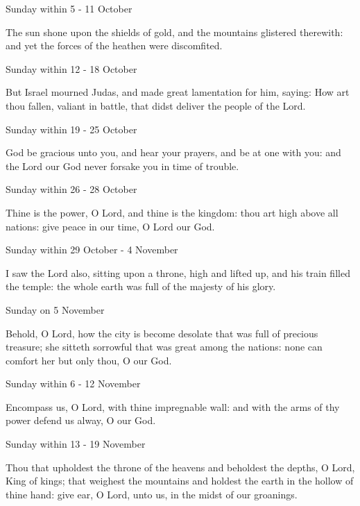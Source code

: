 \begin{multicols}{2}
\begin{inhead}
Sunday within 5 - 11 October
\end{inhead}\par\noindent
The sun shone {\dag} upon the shields of gold, and the mountains glistered therewith: and yet the forces of the heathen were discomfited.
\begin{inhead}
Sunday within 12 - 18 October
\end{inhead}\par\noindent
But Israel mourned Judas, {\dag} and made great lamentation for him, saying: How art thou fallen, valiant in battle, that didst deliver the people of the Lord.
\begin{inhead}
Sunday within 19 - 25 October
\end{inhead}\par\noindent
God be gracious unto you, {\dag} and hear your prayers, and be at one with you: and the Lord our God never forsake you in time of trouble.
\begin{inhead}
Sunday within 26 - 28 October
\end{inhead}\par\noindent
Thine is the power, O Lord, {\dag} and thine is the kingdom: thou art high above all nations: give peace in our time, O Lord our God.
\begin{inhead}
Sunday within 29 October - 4 November
\end{inhead}\par\noindent
I saw the Lord also, {\dag} sitting upon a throne, high and lifted up, and his train filled the temple: the whole earth was full of the majesty of his glory.

\begin{inhead}
Sunday on 5 November
\end{inhead}\par\noindent
Behold, O Lord, {\dag} how the city is become desolate that was full of precious treasure; she sitteth sorrowful that was great among the nations: none can comfort her but only thou, O our God.

\columnbreak

\begin{inhead}
Sunday within 6 - 12 November
\end{inhead}\par\noindent
Encompass us, {\dag} O Lord, with thine impregnable wall: and with the arms of thy power defend us alway, O our God.
\begin{inhead}
Sunday within 13 - 19 November
\end{inhead}\par\noindent
Thou that upholdest {\dag} the throne of the heavens and beholdest the depths, O Lord, King of kings; that weighest the mountains and holdest the earth in the hollow of thine hand: give ear, O Lord, unto us, in the midst of our groanings.


\end{multicols}
